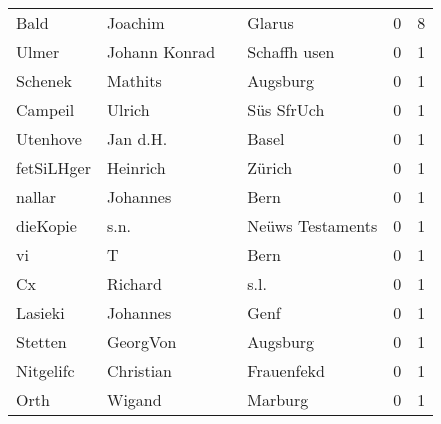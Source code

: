 \begin{center}
\begin{tiny}
\begin{longtabu}{llllrr}
                     Bald &                            Joachim &             &                                      Glarus &          0 &         8 \\
                    Ulmer &                      Johann Konrad &             &                                Schaffh usen &          0 &         1 \\
                  Schenek &                            Mathits &             &                                    Augsburg &          0 &         1 \\
                  Campeil &                             Ulrich &             &                                  Süs SfrUch &          0 &         1 \\
                 Utenhove &                           Jan d.H. &             &                                       Basel &          0 &         1 \\
               fetSiLHger &                           Heinrich &             &                                      Zürich &          0 &         1 \\
                   nallar &                           Johannes &             &                                        Bern &          0 &         1 \\
                 dieKopie &                               s.n. &             &                            Neüws Testaments &          0 &         1 \\
                       vi &                                  T &             &                                        Bern &          0 &         1 \\
                       Cx &                            Richard &             &                                        s.l. &          0 &         1 \\
                  Lasieki &                           Johannes &             &                                        Genf &          0 &         1 \\
                  Stetten &                           GeorgVon &             &                                    Augsburg &          0 &         1 \\
                Nitgelifc &                          Christian &             &                                  Frauenfekd &          0 &         1 \\
                     Orth &                             Wigand &             &                                     Marburg &          0 &         1 \\

\end{longtabu}
\end{tiny}
\end{center}
